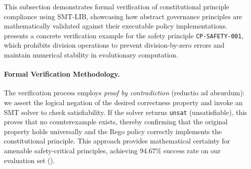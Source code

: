 \documentclass[manuscript,screen,9pt]{acmart}
\begin{document}
This subsection demonstrates formal verification of constitutional principle compliance using SMT-LIB, showcasing how abstract governance principles are mathematically validated against their executable policy implementations.  presents a concrete verification example for the safety principle \texttt{CP-SAFETY-001}, which prohibits division operations to prevent division-by-zero errors and maintain numerical stability in evolutionary computation.

\paragraph{Formal Verification Methodology.} The verification process employs \textit{proof by contradiction} (reductio ad absurdum): we assert the logical negation of the desired correctness property and invoke an SMT solver to check satisfiability. If the solver returns \texttt{unsat} (unsatisfiable), this proves that no counterexample exists, thereby confirming that the original property holds universally and the Rego policy correctly implements the constitutional principle. This approach provides mathematical certainty for amenable safety-critical principles, achieving 94.67\% success rate on our evaluation set ().
\end{document}
